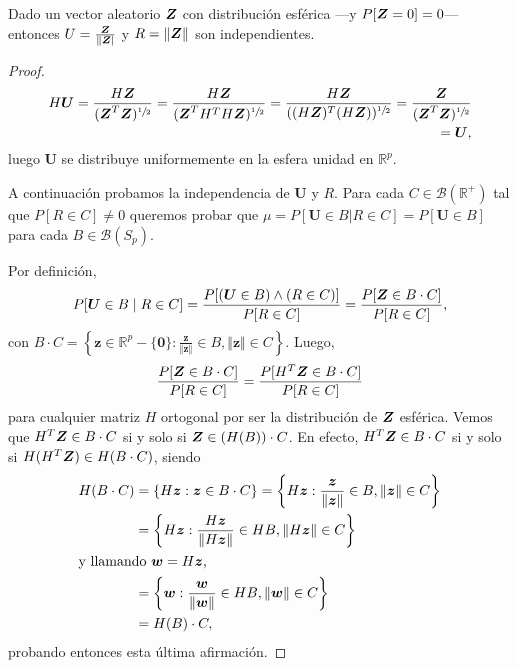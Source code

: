 \begin{nprop}
  Dado un vector aleatorio $\boldsymbol{Z}$ con distribución esférica —y $P[\boldsymbol{Z} = 0] = 0$— entonces $U = \frac{\boldsymbol{Z}}{\Vert\boldsymbol{Z}\vert}$ y $R = \Vert\boldsymbol{Z}\Vert$ son independientes.
\end{nprop}

\begin{proof}
  \begin{align*}
    H\boldsymbol U = \frac{H\boldsymbol{Z}}{(\boldsymbol{Z}^T\boldsymbol{Z})^{\sfrac{1}{2}}}
      = \frac{H\boldsymbol{Z}}{(\boldsymbol{Z}^TH^TH\boldsymbol{Z})^{\sfrac{1}{2}}}
      = \frac{H\boldsymbol{Z}}{((H\boldsymbol{Z})^T(H\boldsymbol{Z}))^{\sfrac{1}{2}}}
      = \frac{\boldsymbol{Z}}{(\boldsymbol{Z}^T\boldsymbol{Z})^{\sfrac{1}{2}}}\\
      = \boldsymbol U,
  \end{align*} luego $\boldsymbol U$ se distribuye uniformemente en la esfera unidad en $\mathbb R^p$.

  A continuación probamos la independencia de $\boldsymbol U$ y $R$. Para cada $C \in \mathcal B(\mathbb R^+)$ tal que $P[R \in C] \neq 0$ queremos probar que $\mu = P[\boldsymbol U \in B | R \in C] = P[\boldsymbol U \in B]$ para cada $B \in \mathcal B(S_p)$.

  Por definición, \begin{align*}
    P[\boldsymbol U \in B \mid R \in C] = \frac{P[(\boldsymbol U \in B) \land (R \in C)]}{P[R \in C]} = \frac{P[\boldsymbol{Z} \in B \cdot C]}{P[R \in C]},
  \end{align*} con $B \cdot C = \left\{\boldsymbol z \in \mathbb R^p - \{\boldsymbol 0\} : \frac{\boldsymbol z}{\Vert \boldsymbol z \Vert} \in B, \Vert \boldsymbol z \Vert \in C\right\}$. Luego, \begin{align*}
    \frac{P[\boldsymbol{Z} \in B \cdot C]}{P[R \in C]} = \frac{P[H^T\boldsymbol{Z} \in B \cdot C]}{P[R \in C]}
  \end{align*} para cualquier matriz $H$ ortogonal por ser la distribución de $\boldsymbol{Z}$ esférica. Vemos que $H^T\boldsymbol{Z} \in B \cdot C$ si y solo si $\boldsymbol{Z} \in (H(B)) \cdot C$. En efecto, $H^T\boldsymbol{Z} \in B \cdot C$ si y solo si $H(H^T\boldsymbol{Z}) \in H(B \cdot C)$, siendo \begin{align*}
    H(B\cdot C) &= \left\{H \boldsymbol z : \boldsymbol z \in B \cdot C\right\} = \left\{H \boldsymbol z : \frac{\boldsymbol z}{\Vert \boldsymbol z \Vert} \in B, \Vert \boldsymbol z \Vert \in C\right\} \\
      &= \left\{H \boldsymbol z : \frac{H \boldsymbol z}{\Vert H \boldsymbol z\Vert} \in HB, \Vert H\boldsymbol z\Vert \in C\right\}\\
      \shortintertext{y llamando $\boldsymbol w = H\boldsymbol z$,}
      &= \left\{\boldsymbol w : \frac{\boldsymbol w}{\Vert \boldsymbol w\Vert} \in HB, \Vert \boldsymbol w\Vert \in C\right\}\\
      &= H(B) \cdot C,
  \end{align*} probando entonces esta última afirmación.


\end{proof}
